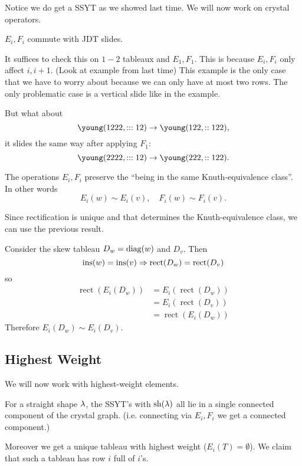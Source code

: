 \documentclass[12pt]{memoir}
\DeclareMathOperator{\ins}{ins}
\DeclareMathOperator{\rect}{rect}
\DeclareMathOperator{\sh}{sh}
\begin{document}
Notice we do get a SSYT as we showed last time. We will now work on crystal operators. 

\begin{Th}
    $E_i,F_i$ commute with JDT slides.
\end{Th}
It suffices to check this on $1-2$ tableaux and $E_1,F_1$. This is because $E_i,F_i$ only affect $i,i+1$. (Look at example from last time) This example is the only case that we have to worry about because we can only have at most two rows. The only problematic case is a vertical slide like in the example.\par 
But what about 
$$\young(1222,:::12)\to\young(122,::122),$$
it slides the same way after applying $F_1$:
$$\young(2222,:::12)\to\young(222,::122).$$

\begin{Th}
The operations $E_i,F_i$ preserve the ``being in the same Knuth-equivalence class''. In other words 
$$E_i(w)\sim E_i(v),\quad F_i(w)\sim F_i(v).$$    
\end{Th}

Since rectification is unique and that determines the Knuth-equivalence class, we can use the previous result.

\begin{ptcbr}
    Consider the skew tableau $D_w=\operatorname{diag}(w)$ and $D_v$. Then 
    $$\ins(w)=\ins(v)\To \rect(D_w)=\rect(D_v)$$
    so 
    \begin{align*}
        \rect(E_i(D_w))&=E_i(\rect(D_w))\\
        &=E_i(\rect(D_v))\\
        &=\rect(E_i(D_w))
    \end{align*} 
    Therefore $E_i(D_w)\sim E_i(D_v)$.
\end{ptcbr}

\subsection{Highest Weight}
We will now work with highest-weight elements.

\begin{Lem}
    For a straight shape $\lambda$, the SSYT's with $\sh(\la)$ all lie in a single connected component of the crystal graph. (i.e. connecting via $E_i,F_i$ we get a connected component.)\par 
    Moreover we get a unique tableau with highest weight ($E_i(T)=\emptyset$). We claim that such a tableau has row $i$ full of $i$'s.
\end{Lem}
\end{document}
